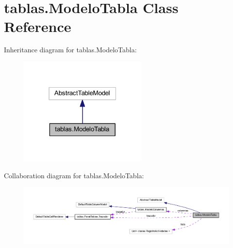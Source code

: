 \hypertarget{classtablas_1_1_modelo_tabla}{}\section{tablas.\+Modelo\+Tabla Class Reference}
\label{classtablas_1_1_modelo_tabla}


Inheritance diagram for tablas.\+Modelo\+Tabla\+:
\nopagebreak
\begin{figure}[H]
\begin{center}
\leavevmode
\includegraphics[width=183pt]{classtablas_1_1_modelo_tabla__inherit__graph}
\end{center}
\end{figure}


Collaboration diagram for tablas.\+Modelo\+Tabla\+:
\nopagebreak
\begin{figure}[H]
\begin{center}
\leavevmode
\includegraphics[width=350pt]{classtablas_1_1_modelo_tabla__coll__graph}
\end{center}
\end{figure}

